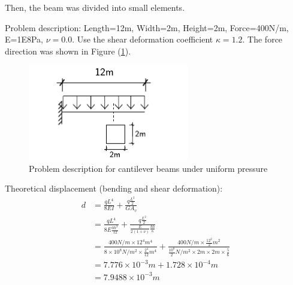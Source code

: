 \documentclass[fleqn,11pt]{article}
\begin{document}

\newpage
Then, the beam was divided into small elements. 

Problem description: Length=12m, Width=2m, Height=2m, Force=400N/m, E=1E8Pa, $\nu=0.0$. Use the shear deformation coefficient $\kappa=1.2$. The force direction was shown in Figure (\ref{fig Problem description for cantilever beams under uniform pressure 27}). 

\begin{figure}[H]
  \centering
  \includegraphics[width=7cm]{../Figure-files/cantilever_12_uniform_load.pdf}
  \caption{Problem description for cantilever beams under uniform pressure  }
  \label{fig Problem description for cantilever beams under uniform pressure 27}
\end{figure}


Theoretical displacement (bending and shear deformation):
\begin{equation}
  \begin{aligned}
  d &=\frac{qL^4}{8EI} + \frac{q \frac{L^2}{2}}{GA_v} \\ 
    &=\frac{qL^4}{8E\frac{bh^3}{12} }+\frac{q \frac{L^2}{2}}{\frac{E}{2(1+\nu)}\frac{bh}{\kappa}} \\
    &= \frac{400 N/m \times 12^4 m^4}{8\times 10^8 N/m^2 \times \frac{2^4}{12} m^4} 
       + \frac{400 N/m \times \frac{12^2}{2} m^2} {\frac{10^8}{2} N/m^2 \times 2m\times 2m\times \frac{5}{6}} \\ 
    &=7.776\times 10^{-3} m  +1.728\times 10^{-4} m \\
    &=7.9488\times 10^{-3} m
   \end{aligned}
\end{equation}
\end{document}
